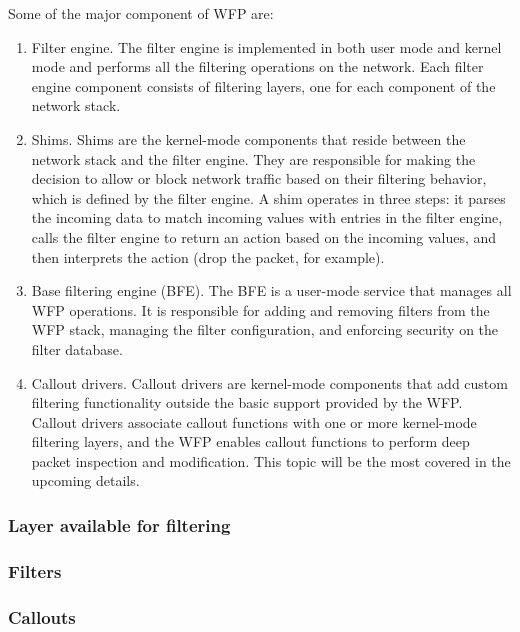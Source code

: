 Some of the major component of WFP are:
\begin{enumerate}

\item Filter engine. The filter engine is implemented in both user mode and kernel mode and performs all the filtering operations on the network. Each filter engine component consists of
filtering layers, one for each component of the network stack.

\item Shims. Shims are the kernel-mode components that reside between the network stack and the filter engine. They are responsible for making the decision to allow or block network traffic
based on their filtering behavior, which is defined by the filter engine. A shim operates in three steps: it parses the incoming data to match incoming values with entries in the filter engine,
calls the filter engine to return an action based on the incoming values, and then interprets the action (drop the packet, for example).

\item Base filtering engine (BFE). The BFE is a user-mode service that manages all WFP operations. It is responsible for adding and removing filters from the WFP stack, managing the filter 
configuration, and enforcing security on the filter database.

\item Callout drivers. Callout drivers are kernel-mode components that add custom filtering functionality outside the basic support provided by the WFP. Callout drivers associate callout 
functions with one or more kernel-mode filtering layers, and the WFP enables callout functions to perform deep packet inspection and modification. This topic will be the most covered in the
upcoming details.

\end{enumerate}

\subsubsection{Layer available for filtering}
\subsubsection{Filters}
\subsubsection{Callouts}

